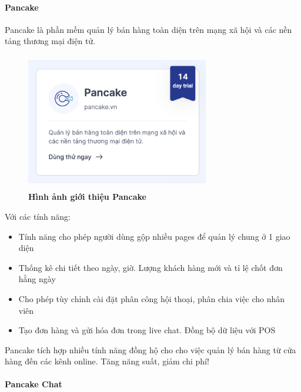 \paragraph{Pancake \cite{pancake}}
\mbox{}

Pancake là phần mềm quản lý bán hàng toàn diện trên mạng xã hội và các nền tảng thương mại điện tử. 
\begin{figure}[H]
  \centering
  \includegraphics[width=8cm,height=6cm]{Images/pancake/pancake.png}
  \caption[Hình ảnh giới thiệu Pancake]{\bfseries \fontsize{12pt}{0pt}
  \selectfont Hình ảnh giới thiệu Pancake}
  \label{ttlk} %
\end{figure}

Với các tính năng: 
\begin{itemize}
  \item Tính năng cho phép người dùng gộp nhiều pages để quản lý chung ở 1 giao diện
  \item Thống kê chi tiết theo ngày, giờ. Lượng khách hàng mới và tỉ lệ chốt đơn hằng ngày
  \item Cho phép tùy chỉnh cài đặt phân công hội thoại, phân chia việc cho nhân viên
  \item Tạo đơn hàng và gửi hóa đơn trong live chat. Đồng bộ dữ liệu với POS
\end{itemize}
Pancake tích hợp nhiều tính năng đồng hộ cho cho việc quản lý bán hàng từ cửa hàng đến các kênh online. 
Tăng năng suất, giảm chi phí!

\paragraph{Pancake Chat \cite{panchat}}
\mbox{}

